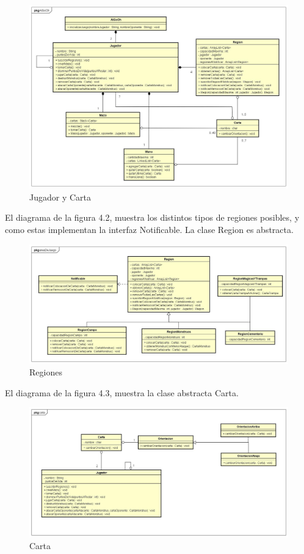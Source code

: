 \begin{figure}[H]
	\centering
	\includegraphics[scale=0.3]{includes/Jugador}
	\caption{Jugador y Carta}
	\label{Jugador}
\end{figure}

El diagrama de la figura 4.2, muestra los distintos tipos de regiones posibles, y como estas implementan la interfaz Notificable. La clase Region es abstracta.

\begin{figure}[H]
	\centering
	\includegraphics[scale=0.3]{includes/areaDeJuego}
	\caption{Regiones}
	\label{areaDeJuego}
\end{figure}

El diagrama de la figura 4.3, muestra la clase abstracta Carta.

\begin{figure}[H]
	\centering
	\includegraphics[scale=0.3]{includes/Carta}
	\caption{Carta}
	\label{Cartas}
\end{figure}

